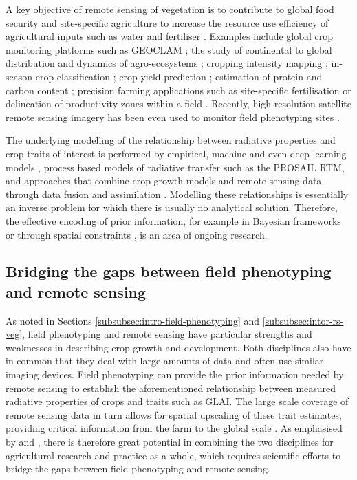 A key objective of remote sensing of vegetation is to contribute to global food security and site-specific agriculture to increase the resource use efficiency of agricultural inputs such as water and fertiliser \citep{bach_sustainable_2018}. Examples include global crop monitoring platforms such as \gls{GEOCLAM} \citep{becker-reshef_strengthening_2020}; the study of continental to global distribution and dynamics of agro-ecosystems \citep{bolton_continental-scale_2020, dandrimont_detecting_2020, winkler_global_2021, moon_multiscale_2021}; cropping intensity mapping \citep{liu_mapping_2020}; in-season crop classification \citep{ruswurm_end--end_2023}; crop yield prediction \citep{perich_pixel-based_2022}; estimation of protein and carbon content \cite{feret_prospect-pro_2021, longmire_estimation_2023}; precision farming applications such as site-specific fertilisation \citep{argento_site-specific_2021} or delineation of productivity zones within a field \citep{georgi_automatic_2018}. Recently, high-resolution satellite remote sensing imagery has been even used to monitor field phenotyping sites \citep{pinto_satellite_2023}.

The underlying modelling of the relationship between radiative properties and crop traits of interest is performed by empirical, machine and even deep learning models \citep{verrelst_quantifying_2019}, process based models of radiative transfer \citep{jacquemoud_prospectsail_2009} such as the PROSAIL \gls{RTM}, and approaches that combine crop growth models and remote sensing data through data fusion and assimilation \citep{ma_wheat_2022}. Modelling these relationships is essentially an inverse problem for which there is usually no analytical solution. Therefore, the effective encoding of prior information, for example in Bayesian frameworks \citep{zhang_towards_2023} or through spatial constraints \citep{atzberger_spatially_2012}, is an area of ongoing research.

\subsection{Bridging the gaps between field phenotyping and remote sensing}
As noted in Sections \ref{subsubsec:intro-field-phenotyping} and \ref{subsubsec:intor-rs-veg}, field phenotyping and remote sensing have particular strengths and weaknesses in describing crop growth and development. Both disciplines also have in common that they deal with large amounts of data and often use similar imaging devices. Field phenotyping can provide the prior information needed by remote sensing to establish the aforementioned relationship between measured radiative properties of crops and traits such as \gls{GLAI}. The large scale coverage of remote sensing data in turn allows for spatial upscaling of these trait estimates, providing critical information from the farm to the global scale \citep{weiss_remote_2020}. As emphasised by \cite{machwitz_bridging_2021} and \cite{walter_advances_2022}, there is therefore great potential in combining the two disciplines for agricultural research and practice as a whole, which requires scientific efforts to bridge the gaps between field phenotyping and remote sensing.

